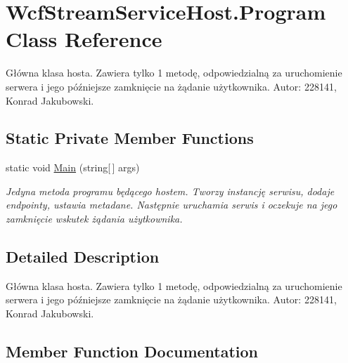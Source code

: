 \hypertarget{class_wcf_stream_service_host_1_1_program}{}\section{Wcf\+Stream\+Service\+Host.\+Program Class Reference}
\label{class_wcf_stream_service_host_1_1_program}


Główna klasa hosta. Zawiera tylko 1 metodę, odpowiedzialną za uruchomienie serwera i jego późniejsze zamknięcie na żądanie użytkownika. Autor\+: 228141, Konrad Jakubowski.  


\subsection*{Static Private Member Functions}
\begin{DoxyCompactItemize}
\item 
static void \hyperlink{class_wcf_stream_service_host_1_1_program_ae89bf8b860094f07af5d583ecc0cfcd4}{Main} (string\mbox{[}$\,$\mbox{]} args)
\begin{DoxyCompactList}\small\item\em Jedyna metoda programu będącego hostem. Tworzy instancję serwisu, dodaje endpointy, ustawia metadane. Następnie uruchamia serwis i oczekuje na jego zamknięcie wskutek żądania użytkownika. \end{DoxyCompactList}\end{DoxyCompactItemize}


\subsection{Detailed Description}
Główna klasa hosta. Zawiera tylko 1 metodę, odpowiedzialną za uruchomienie serwera i jego późniejsze zamknięcie na żądanie użytkownika. Autor\+: 228141, Konrad Jakubowski. 



\subsection{Member Function Documentation}
\mbox{\label{class_wcf_stream_service_host_1_1_program_ae89bf8b860094f07af5d583ecc0cfcd4}} 
